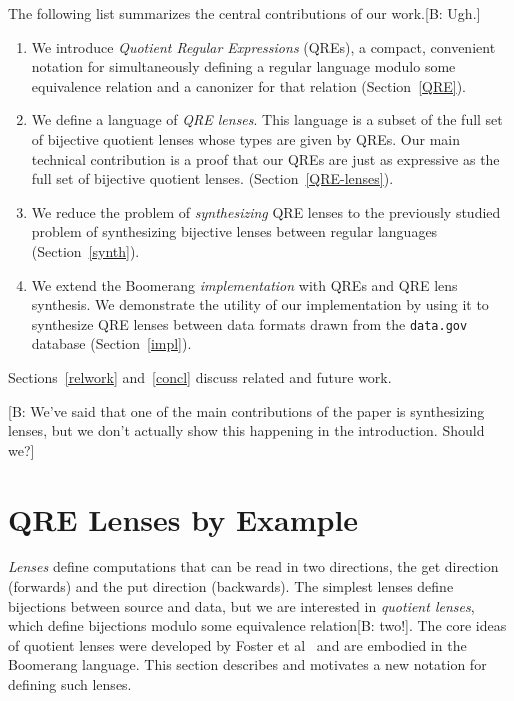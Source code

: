 \documentclass[acmsmall,review,anonymous]{acmart}
\newcommand{\FINISH}[3]{\ifdraft\textcolor{#1}{[#2: #3]}\fi}
\newcommand{\bcp}[1]{\FINISH{dkred}{B}{#1}}
\begin{document}
The following list summarizes the central contributions of our
work.\bcp{Ugh.} 
\begin{enumerate}
  \item We introduce {\em Quotient Regular Expressions} (QREs),
  a compact, convenient notation for simultaneously defining a
  regular language modulo some equivalence relation and a canonizer
  for that relation (Section~\ref{QRE}).
  \item We define a language of {\em QRE lenses}.  This language is
  a subset of the full set of bijective quotient
  lenses whose types are given by QREs. Our main technical contribution
  is a proof that our QREs are just as expressive as the full set of bijective
  quotient lenses.
  (Section~\ref{QRE-lenses}).
  \item We reduce the problem of {\em synthesizing}
  QRE lenses to the previously studied problem of synthesizing bijective lenses
  between regular languages (Section~\ref{synth}).
  \item We extend the Boomerang {\em implementation} with QREs
  and QRE lens synthesis.  We demonstrate the utility of our
  implementation by using it to
  synthesize QRE lenses between data formats drawn from the
  {\tt data.gov} database (Section~\ref{impl}).
\end{enumerate}
Sections~\ref{relwork} and~\ref{concl} discuss related and future work.

\bcp{We've said that one of the main contributions of the paper is
  synthesizing lenses, but we don't actually show this happening in the
  introduction.  Should we?}

\section{QRE Lenses by Example}
\label{sec:example}


\emph{Lenses} define computations that can be read in two directions, the
get direction (forwards) and the put direction (backwards).  The simplest
lenses define bijections between source and data, but we are interested in
\emph{quotient lenses}, which define bijections modulo some equivalence
relation\bcp{two!}.  The core ideas of quotient lenses were developed by
Foster et al~\cite{quotientlenses} and are embodied in the Boomerang
language.  This section describes and motivates a 
new notation for defining such lenses.
\end{document}
